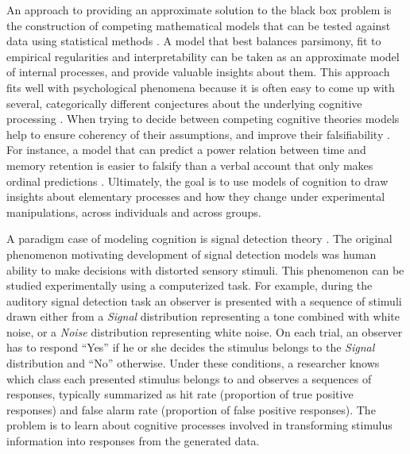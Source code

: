 \documentclass[12pt]{article}
\begin{document}
An approach to providing an approximate solution to the black box problem
is the construction of competing mathematical models that can be
tested against data using statistical methods
\citep{Lju1999,Lju2010,CasBer2002,GelCar2013}. A model that best balances
parsimony, fit to empirical regularities and interpretability can be taken
as an approximate model of internal processes, and provide valuable insights
about them. This approach fits well with psychological
phenomena because it is often easy to come up with several, categorically
different conjectures about the underlying cognitive processing
\citep{TowAsh1983}. When trying to decide between competing cognitive theories models help to ensure coherency of their assumptions, and improve their falsifiability
\citep{BusDie2010,LewFar2010,LeeWag2014}. For instance, a model that can
predict a power relation between time and memory retention is easier to
falsify than a verbal account that only makes ordinal predictions
\citep{CavMyu2013}. Ultimately, the goal is to use models of cognition to
draw insights about elementary processes and how they change under
experimental manipulations, across individuals and across groups.

A paradigm case of modeling cognition is signal detection
theory \citep{MacCre2004}. The original phenomenon motivating development
of signal detection models was human ability to make decisions with
distorted sensory stimuli. This phenomenon can be studied experimentally
using a computerized task. For example, during the auditory signal
detection task an observer is presented with a sequence of stimuli drawn
either from a \textit{Signal} distribution representing a tone combined with
white noise, or a \textit{Noise} distribution representing white noise. On each
trial, an observer has to respond ``Yes'' if he or she decides the
stimulus belongs to the \textit{Signal} distribution and ``No'' otherwise. Under
these conditions, a researcher knows which class each presented stimulus
belongs to and observes a sequences of responses, typically summarized as
hit rate (proportion of true positive responses) and false alarm
rate (proportion of false positive responses). The problem is to
learn about cognitive processes involved in transforming stimulus
information into responses from the generated data.
\end{document}
